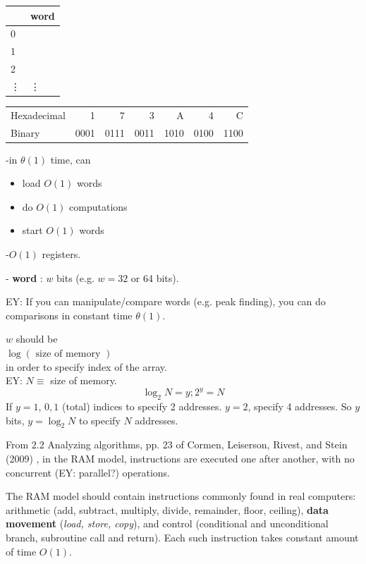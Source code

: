 \documentclass[10pt]{amsart}
\begin{document}
\begin{multicols*}{2}
\begin{table}
	\begin{tabular}{ l|l}
		& word \\ \hline
	0	&   \\ \hline
	1	&   \\ \hline
	2	&   \\ \hline
	\vdots	&  \vdots \\  \hline
	\end{tabular}
\end{table}
\begin{center}
	\begin{tabular}{ l | r | r | r | r | r | r }
		Hexadecimal & 1 & 7 & 3 & A & 4 & C \\
		Binary & 0001 & 0111& 0011 & 1010 & 0100 & 1100 \\
	\end{tabular}
\end{center}
-in $\theta(1)$ time, can \\
\begin{itemize}
	\item load $O(1)$ words 
	\item do $O(1)$ computations
	\item start $O(1)$ words
\end{itemize}
-$O(1)$ registers.

- \textbf{word} : $w$ bits (e.g. $w = 32$ or 64 bits).

EY: If you can manipulate/compare words (e.g. peak finding), you can do comparisons in constant time $\theta(1)$. 

$w$ should be \\
$\log{(\text{ size of memory })}$ \\
in order to specify index of the array. \\

EY: $N \equiv$ size of memory. 
\[
\log_2{N} = y; 2^y = N
\]
If $y=1$, $0,1$ (total) indices to specify 2 addresses. $y=2$, specify 4 addresses. So $y$ bits, $y=\log_2{N}$ to specify $N$ addresses.

From 2.2 Analyzing algorithms, pp. 23 of Cormen, Leiserson, Rivest, and Stein (2009) \cite{CLRS2009}, in the RAM model, instructions are executed one after another, with no concurrent (EY: parallel?) operations.

The RAM model should contain instructions commonly found in real computers: arithmetic (add, subtract, multiply, divide, remainder, floor, ceiling), \textbf{data movement} (\emph{load, store, copy}), and control (conditional and unconditional branch, subroutine call and return). Each such instruction takes constant amount of time $O(1)$.


\end{multicols*}
\end{document}
